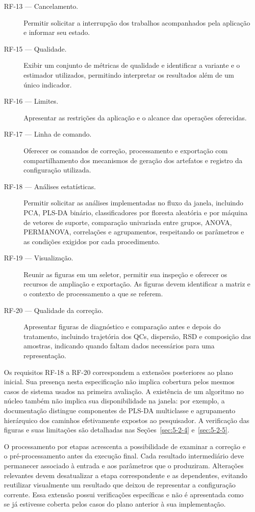 \begin{description}
\item[RF-13 --- Cancelamento.] Permitir solicitar a interrupção dos trabalhos acompanhados pela aplicação e informar seu estado.
\item[RF-15 --- Qualidade.] Exibir um conjunto de métricas de qualidade e identificar a variante e o estimador utilizados, permitindo interpretar os resultados além de um único indicador.
\item[RF-16 --- Limites.] Apresentar as restrições da aplicação e o alcance das operações oferecidas.
\item[RF-17 --- Linha de comando.] Oferecer os comandos de correção, processamento e exportação com compartilhamento dos mecanismos de geração dos artefatos e registro da configuração utilizada.
\item[RF-18 --- Análises estatísticas.] Permitir solicitar as análises implementadas no fluxo da janela, incluindo PCA, PLS-DA binário, classificadores por floresta aleatória e por máquina de vetores de suporte, comparação univariada entre grupos, ANOVA, PERMANOVA, correlações e agrupamentos, respeitando os parâmetros e as condições exigidos por cada procedimento.
\item[RF-19 --- Visualização.] Reunir as figuras em um seletor, permitir sua inspeção e oferecer os recursos de ampliação e exportação. As figuras devem identificar a matriz e o contexto de processamento a que se referem.
\item[RF-20 --- Qualidade da correção.] Apresentar figuras de diagnóstico e comparação antes e depois do tratamento, incluindo trajetória dos QCs, dispersão, RSD e composição das amostras, indicando quando faltam dados necessários para uma representação.
\end{description}

Os requisitos RF-18 a RF-20 correspondem a extensões posteriores ao plano inicial. Sua presença nesta especificação não implica cobertura pelos mesmos casos de sistema usados na primeira avaliação. A existência de um algoritmo no núcleo também não implica sua disponibilidade na janela: por exemplo, a documentação distingue componentes de PLS-DA multiclasse e agrupamento hierárquico dos caminhos efetivamente expostos ao pesquisador. A verificação das figuras e suas limitações são detalhadas nas Seções~\ref{sec:5-2-4} e~\ref{sec:5-2-5}.

O processamento por etapas acrescenta a possibilidade de examinar a correção e o pré-processamento antes da execução final. Cada resultado intermediário deve permanecer associado à entrada e aos parâmetros que o produziram. Alterações relevantes devem desatualizar a etapa correspondente e as dependentes, evitando reutilizar visualmente um resultado que deixou de representar a configuração corrente. Essa extensão possui verificações específicas e não é apresentada como se já estivesse coberta pelos casos do plano anterior à sua implementação.

